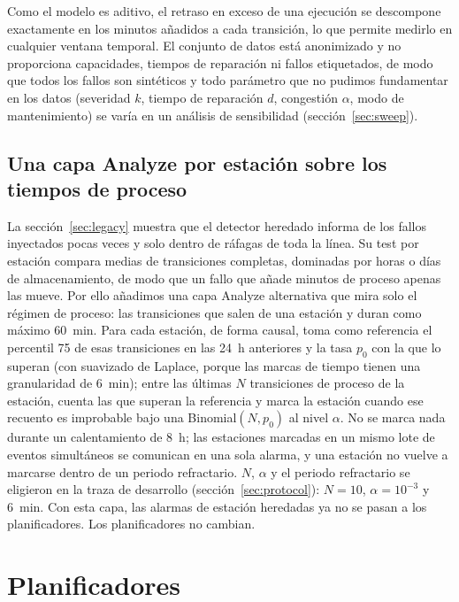 \documentclass[preprint,11pt]{elsarticle}
\begin{document}
Como el modelo es aditivo, el retraso en exceso de una ejecución se descompone exactamente en los minutos añadidos a cada transición, lo que permite medirlo en cualquier ventana temporal. El conjunto de datos está anonimizado y no proporciona capacidades, tiempos de reparación ni fallos etiquetados, de modo que todos los fallos son sintéticos y todo parámetro que no pudimos fundamentar en los datos (severidad $k$, tiempo de reparación $d$, congestión $\alpha$, modo de mantenimiento) se varía en un análisis de sensibilidad (sección~\ref{sec:sweep}).

\subsection{Una capa Analyze por estación sobre los tiempos de proceso}
\label{sec:perstation}
La sección~\ref{sec:legacy} muestra que el detector heredado informa de los fallos inyectados pocas veces y solo dentro de ráfagas de toda la línea. Su test por estación compara medias de transiciones completas, dominadas por horas o días de almacenamiento, de modo que un fallo que añade minutos de proceso apenas las mueve. Por ello añadimos una capa Analyze alternativa que mira solo el régimen de proceso: las transiciones que salen de una estación y duran como máximo 60~min. Para cada estación, de forma causal, toma como referencia el percentil 75 de esas transiciones en las 24~h anteriores y la tasa $p_0$ con la que lo superan (con suavizado de Laplace, porque las marcas de tiempo tienen una granularidad de 6~min); entre las últimas $N$ transiciones de proceso de la estación, cuenta las que superan la referencia y marca la estación cuando ese recuento es improbable bajo una Binomial$(N, p_0)$ al nivel $\alpha$. No se marca nada durante un calentamiento de 8~h; las estaciones marcadas en un mismo lote de eventos simultáneos se comunican en una sola alarma, y una estación no vuelve a marcarse dentro de un periodo refractario. $N$, $\alpha$ y el periodo refractario se eligieron en la traza de desarrollo (sección~\ref{sec:protocol}): $N=10$, $\alpha=10^{-3}$ y 6~min. Con esta capa, las alarmas de estación heredadas ya no se pasan a los planificadores. Los planificadores no cambian.

\section{Planificadores}
\label{sec:planners}
\end{document}
